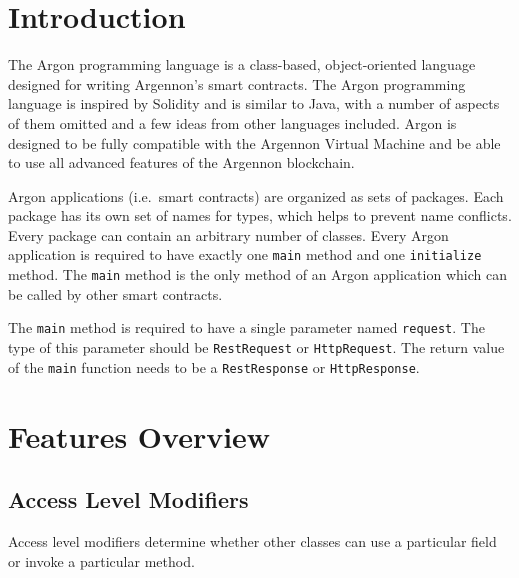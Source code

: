 

\section{Introduction}\label{sec:introduction2}

The Argon programming language is a class-based, object-oriented language designed for writing Argennon's smart
contracts. The Argon programming language is inspired by Solidity and is similar to Java, with a number of aspects
of them omitted and a few ideas from other languages included. Argon is designed to be fully compatible with
the Argennon Virtual Machine and be able to use all advanced features of the Argennon blockchain.

Argon applications (i.e.\ smart contracts) are organized as sets of packages. Each package has its own set of names
for types, which helps to prevent name conflicts. Every package can contain an arbitrary number of classes.
Every Argon application is required
to have exactly one \texttt{main} method and one \texttt{initialize} method. The \texttt{main} method is the
only method of an Argon application which can be called by other smart contracts.

The \texttt{main} method is required to have a single parameter named \texttt{request}. The type of this parameter
should be \texttt{RestRequest} or \texttt{HttpRequest}. The return value of the \texttt{main} function needs to be a
\texttt{RestResponse} or \texttt{HttpResponse}.


\section{Features Overview}\label{sec:features-overview}

\subsection{Access Level Modifiers}\label{subsec:access-level-modifiers}

Access level modifiers determine whether other classes can use a particular field or invoke a particular method.

